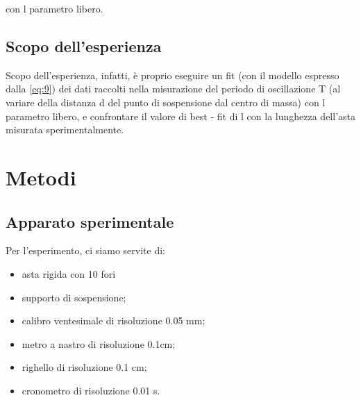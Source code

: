\documentclass{article}
\begin{document}
con l parametro libero.

\vspace{1em}

\subsection{Scopo dell'esperienza} 
Scopo dell'esperienza, infatti, è proprio eseguire un fit (con il modello espresso dalla \eqref{eq:9}) dei dati raccolti nella misurazione del periodo di oscillazione T (al variare della distanza d del punto di sospensione dal centro di massa) con l parametro libero, e confrontare il valore di best - fit di l con la lunghezza dell'asta misurata sperimentalmente.

\section{Metodi} 

\subsection{Apparato sperimentale} 
Per l'esperimento, ci siamo servite di:

\begin{itemize}
    \item asta rigida con 10 fori
    \item supporto di sospensione;
    \item calibro ventesimale di risoluzione 0.05 mm;
    \item metro a nastro di risoluzione 0.1cm;
    \item righello di risoluzione 0.1 cm;
    \item cronometro di risoluzione 0.01 s.
\end{itemize}
\vspace{1em}

\FloatBarrier
\end{document}
